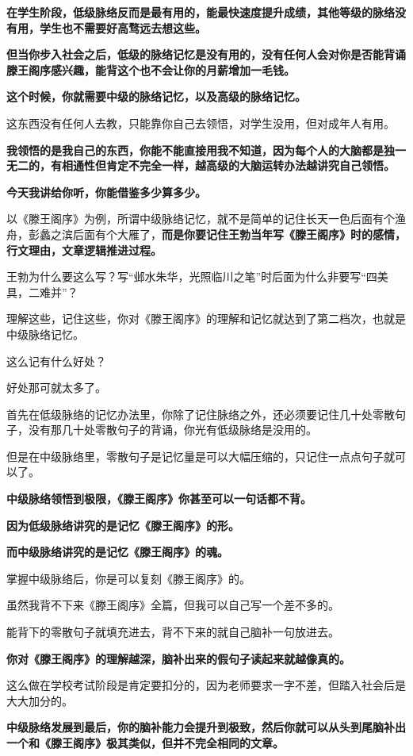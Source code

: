 \documentclass[UTF8, 11pt, oneside]{ctexart}
\newcommand{\zd}[1]{\textbf{\textcolor[RGB]{123,12,0}{#1}}} %
\begin{document}
\zd{在学生阶段，低级脉络反而是最有用的，能最快速度提升成绩，其他等级的脉络没有用，学生也不需要好高骛远去想这些。}

\zd{但当你步入社会之后，低级的脉络记忆是没有用的，没有任何人会对你是否能背诵滕王阁序感兴趣，能背这个也不会让你的月薪增加一毛钱。}

\zd{这个时候，你就需要中级的脉络记忆，以及高级的脉络记忆。}

这东西没有任何人去教，只能靠你自己去领悟，对学生没用，但对成年人有用。

\zd{我领悟的是我自己的东西，你能不能直接用我不知道，因为每个人的大脑都是独一无二的，有相通性但肯定不完全一样，越高级的大脑运转办法越讲究自己领悟。}

\zd{今天我讲给你听，你能借鉴多少算多少。}

以《滕王阁序》为例，所谓中级脉络记忆，就不是简单的记住长天一色后面有个渔舟，彭蠡之滨后面有个大雁了，\zd{而是你要记住王勃当年写《滕王阁序》时的感情，行文理由，文章逻辑推进过程。}

王勃为什么要这么写？写“邺水朱华，光照临川之笔”时后面为什么非要写“四美具，二难并”？

理解这些，记住这些，你对《滕王阁序》的理解和记忆就达到了第二档次，也就是中级脉络记忆。

这么记有什么好处？

好处那可就太多了。

首先在低级脉络的记忆办法里，你除了记住脉络之外，还必须要记住几十处零散句子，没有那几十处零散句子的背诵，你光有低级脉络是没用的。

但是在中级脉络里，零散句子是记忆量是可以大幅压缩的，只记住一点点句子就可以了。

\zd{中级脉络领悟到极限，《滕王阁序》你甚至可以一句话都不背。}

\zd{因为低级脉络讲究的是记忆《滕王阁序》的形。}

\zd{而中级脉络讲究的是记忆《滕王阁序》的魂。}

掌握中级脉络后，你是可以复刻《滕王阁序》的。

虽然我背不下来《滕王阁序》全篇，但我可以自己写一个差不多的。

能背下的零散句子就填充进去，背不下来的就自己脑补一句放进去。

\zd{你对《滕王阁序》的理解越深，脑补出来的假句子读起来就越像真的。}

这么做在学校考试阶段是肯定要扣分的，因为老师要求一字不差，但踏入社会后是大大加分的。

\zd{中级脉络发展到最后，你的脑补能力会提升到极致，然后你就可以从头到尾脑补出一个和《滕王阁序》极其类似，但并不完全相同的文章。}
\end{document}
